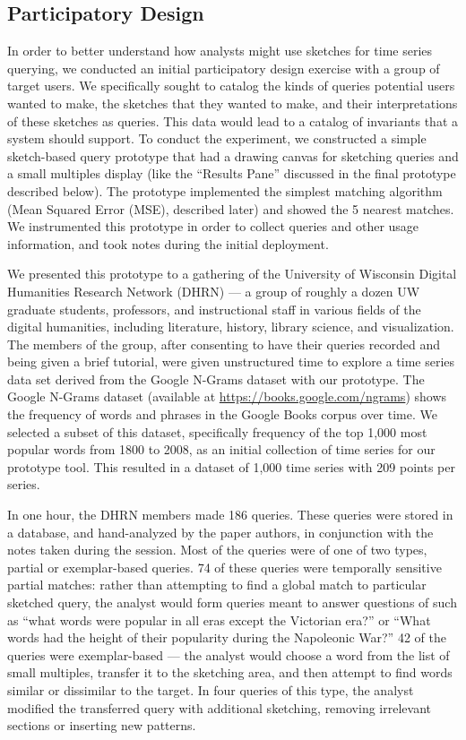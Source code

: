 \subsection{Participatory Design}
\label{sec:ngrams}

In order to better understand how analysts might use sketches for time series querying, we conducted an initial participatory design exercise with a group of target users. We specifically sought to catalog the kinds of queries potential users wanted to make, the sketches that they wanted to make, and their interpretations of these sketches as queries. This data would lead to a catalog of invariants that a system should support. To conduct the experiment, we constructed a simple sketch-based query prototype that had a drawing canvas for sketching queries and a small multiples display (like the ``Results Pane'' discussed in the final prototype described below). The prototype implemented the simplest matching algorithm (Mean Squared Error (MSE), described later) and showed the 5 nearest matches. We instrumented this prototype in order to collect queries and other usage information, and took notes during the initial deployment.

We presented this prototype to a gathering of the University of Wisconsin Digital Humanities Research Network (DHRN) --- a group of roughly a dozen UW graduate students, professors, and instructional staff in various fields of the digital humanities, including literature, history, library science, and visualization. The members of the group, after consenting to have their queries recorded and being given a brief tutorial, were given unstructured time to explore a time series data set derived from the Google N-Grams dataset with our prototype. The Google N-Grams dataset (available at  \url{https://books.google.com/ngrams}) shows the frequency of words and phrases in the Google Books corpus over time. We selected a subset of this dataset, specifically frequency of the top 1,000 most popular words from 1800 to 2008, as an initial collection of time series for our prototype tool. This resulted in a dataset of 1,000 time series with 209 points per series.

In one hour, the DHRN members made 186 queries. These queries were stored in a database, and hand-analyzed by the paper authors, in conjunction with the notes taken during the session. Most of the queries were of one of two types, partial or exemplar-based queries. 74 of these queries were temporally sensitive partial matches: rather than attempting to find a global match to particular sketched query, the analyst would form queries meant to answer questions of such as ``what words were popular in all eras except the Victorian era?'' or ``What words had the height of their popularity during the Napoleonic War?'' 42 of the queries were exemplar-based --- the analyst would choose a word from the list of small multiples, transfer it to the sketching area, and then attempt to find words similar or dissimilar to the target. In four queries of this type, the analyst modified the transferred query with additional sketching, removing irrelevant sections or inserting new patterns.

